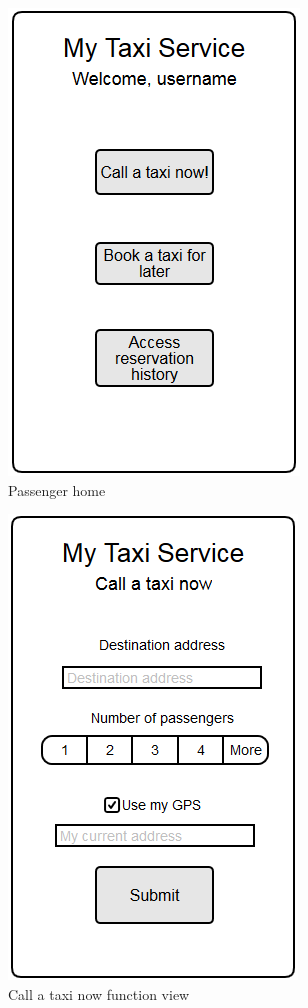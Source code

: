 \begin{figure}
\centering
\includegraphics{tex-images/ui-passenger-home}
\caption{Passenger home}
\end{figure}

\begin{figure}
\centering
\includegraphics{tex-images/ui-passenger-call-taxi-now}
\caption{Call a taxi now function view}
\end{figure}


